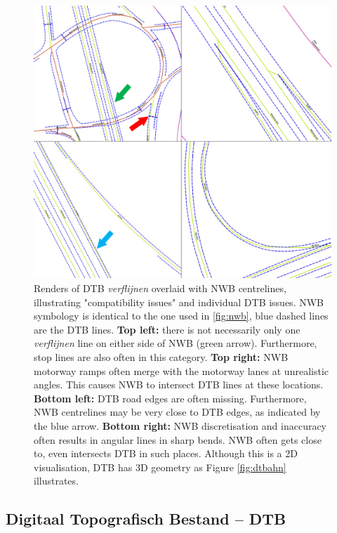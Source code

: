 \begin{figure}[h!]
    \centering
    \includegraphics[width=0.95\linewidth]{p2/figs/dtb_sample_07.png} 
    \caption{Renders of DTB \textit{verflijnen} overlaid with NWB centrelines, illustrating "compatibility issues" and individual DTB issues. NWB symbology is identical to the one used in \ref{fig:nwb}, blue dashed lines are the DTB lines. \textbf{Top left:} there is not necessarily only one \textit{verflijnen} line on either side of NWB (green arrow). Furthermore, stop lines are also often in this category. \textbf{Top right:} NWB motorway ramps often merge with the motorway lanes at unrealistic angles. This causes NWB to intersect DTB lines at these locations. \textbf{Bottom left:} DTB road edges are often missing. Furthermore, NWB centrelines may be very close to DTB edges, as indicated by the blue arrow. \textbf{Bottom right:} NWB discretisation and inaccuracy often results in angular lines in sharp bends. NWB often gets close to, even intersects DTB in such places. Although this is a 2D visualisation, DTB has 3D geometry as Figure \ref{fig:dtbahn} illustrates.}
    \label{fig:dtbnwb}
\end{figure}

\subsection{Digitaal Topografisch Bestand – DTB}
\label{sub:dtb}

